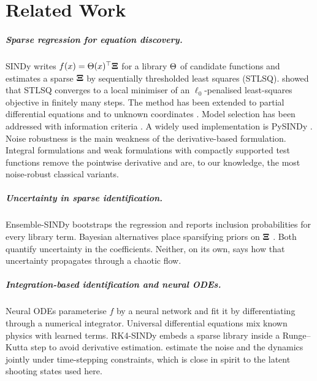 \chapter{Related Work}\label{ch:related}

\paragraph{Sparse regression for equation discovery.}
SINDy \parencite{brunton2016sindy} writes $f(x)=\Theta(x)^\top\bm{\Xi}$ for a library $\Theta$ of candidate functions and estimates a sparse $\bm{\Xi}$ by sequentially thresholded least squares (STLSQ). \textcite{zhang2019convergence} showed that STLSQ converges to a local minimiser of an $\ell_0$-penalised least-squares objective in finitely many steps. The method has been extended to partial differential equations \parencite{rudy2017pdefind} and to unknown coordinates \parencite{champion2019coordinates}. Model selection has been addressed with information criteria \parencite{mangan2017model}. A widely used implementation is PySINDy \parencite{kaptanoglu2022pysindy}. Noise robustness is the main weakness of the derivative-based formulation. Integral formulations \parencite{schaeffer2017integral} and weak formulations with compactly supported test functions \parencite{reinbold2020weak,messenger2021wsindy} remove the pointwise derivative and are, to our knowledge, the most noise-robust classical variants.

\paragraph{Uncertainty in sparse identification.}
Ensemble-SINDy \parencite{fasel2022esindy} bootstraps the regression and reports inclusion probabilities for every library term. Bayesian alternatives place sparsifying priors on $\bm{\Xi}$ \parencite{hirsh2022priors}. Both quantify uncertainty in the coefficients. Neither, on its own, says how that uncertainty propagates through a chaotic flow.

\paragraph{Integration-based identification and neural ODEs.}
Neural ODEs \parencite{chen2018node,kidger2021thesis} parameterise $f$ by a neural network and fit it by differentiating through a numerical integrator. Universal differential equations \parencite{rackauckas2020ude} mix known physics with learned terms. RK4-SINDy \parencite{goyal2022rk4sindy} embeds a sparse library inside a Runge--Kutta step to avoid derivative estimation. \textcite{rudy2019denoising} estimate the noise and the dynamics jointly under time-stepping constraints, which is close in spirit to the latent shooting states used here.

